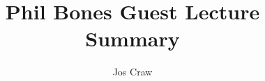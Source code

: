 \documentclass{article}
\title{Phil Bones Guest Lecture Summary}
\author{Jos Craw}
\begin{document}
\maketitle{}
\end{document}
